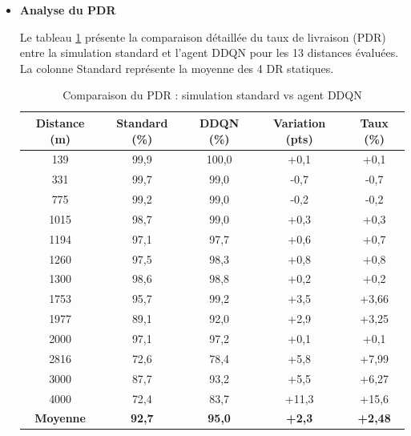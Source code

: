 \begin{itemize}
	\item \textbf{Analyse du PDR}
	
	Le tableau \ref{tab:comparaison-pdr} présente la comparaison détaillée du taux de livraison (PDR) entre la simulation standard et l'agent DDQN pour les 13 distances évaluées. La colonne Standard représente la moyenne des 4 DR statiques.
	
	\begin{table}[H]
		\centering
		\caption{Comparaison du PDR : simulation standard vs agent DDQN}
		\label{tab:comparaison-pdr}
		\begin{tabular}{|c|c|c|c|c|}
			\hline
			\textbf{Distance (m)} & \textbf{Standard (\%)} & \textbf{DDQN (\%)} & \textbf{Variation (pts)} & \textbf{Taux (\%)}\\
			\hline
			\hline
			139  & 99,9 & 100,0 & +0,1 &\cellcolor{green!30} +0,1\\
			\hline
			331  & 99,7 & 99,0  & -0,7 & \cellcolor{red!30} -0,7 \\
			\hline
			775  & 99,2 & 99,0  & -0,2 & \cellcolor{red!30} -0,2\\
			\hline
			1015 & 98,7 & 99,0  & +0,3 &\cellcolor{green!30} +0,3\\
			\hline
			1194 & 97,1 & 97,7  & +0,6 &\cellcolor{green!30} +0,7\\
			\hline
			1260 & 97,5 & 98,3  & +0,8 &\cellcolor{green!30} +0,8\\
			\hline
			1300 & 98,6 & 98,8  & +0,2 & \cellcolor{green!30}+0,2\\
			\hline
			1753 & 95,7 & 99,2  & +3,5 & \cellcolor{green!30}+3,66\\
			\hline
			1977 & 89,1 & 92,0  & +2,9 &\cellcolor{green!30} +3,25\\
			\hline
			2000 & 97,1 & 97,2  & +0,1 &\cellcolor{green!30} +0,1\\
			\hline
			2816 & 72,6 & 78,4  & +5,8 &\cellcolor{green!30} +7,99 \\
			\hline
			3000 & 87,7 & 93,2  & +5,5 &\cellcolor{green!30}+6,27\\
			\hline
			4000 & 72,4 & 83,7  & +11,3 &\cellcolor{green!30} +15,6 \\
			\hline
			\hline
			\textbf{Moyenne} & \textbf{92,7} & \textbf{95,0} & \textbf{+2,3} & \cellcolor{green!30} \textbf{+2,48} \\
			\hline
		\end{tabular}
	\end{table}
	

\end{itemize}
